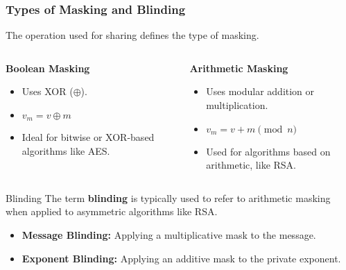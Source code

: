 \begin{frame}
    \frametitle{Types of Masking and Blinding}

    The operation used for sharing defines the type of masking.
    
    \begin{columns}[T]
        \begin{column}{0.5\textwidth}
            \textbf{Boolean Masking}
            \begin{itemize}
                \item Uses XOR ($\oplus$).
                \item $v_m = v \oplus m$
                \item Ideal for bitwise or XOR-based algorithms like AES.
            \end{itemize}
        \end{column}
        \begin{column}{0.5\textwidth}
            \textbf{Arithmetic Masking}
            \begin{itemize}
                \item Uses modular addition or multiplication.
                \item $v_m = v + m \pmod{n}$
                \item Used for algorithms based on arithmetic, like RSA.
            \end{itemize}
        \end{column}
    \end{columns}
    
    \begin{block}{Blinding}
        The term \textbf{blinding} is typically used to refer to arithmetic masking when applied to asymmetric algorithms like RSA.
        \begin{itemize}
            \item \textbf{Message Blinding:} Applying a multiplicative mask to the message.
            \item \textbf{Exponent Blinding:} Applying an additive mask to the private exponent.
        \end{itemize}
    \end{block}
\end{frame}








